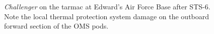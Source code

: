 \begin{figure}[hbtp]
\begin{center}
    \caption[\emph{Challenger} on the tarmac at Edward's Air Force Base after STS-6.]{\emph{Challenger} on the tarmac at Edward's Air Force Base after STS-6.  Note the local thermal protection system damage on the outboard forward section of the OMS pods.\label{fig:challenger_sts6_tarmac}}
  \end{center}
\end{figure}

